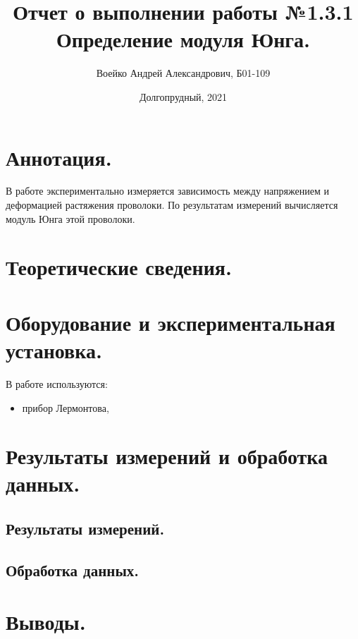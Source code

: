 \documentclass[a4paper,11pt]{article}
\title{Отчет о выполнении работы №1.3.1\\Определение модуля Юнга.}
\author{Воейко Андрей Александрович, Б01-109}
\date{Долгопрудный, 2021}
\begin{document}
\maketitle
\newpage
\section{Аннотация.}
В работе экспериментально измеряется зависимость между напряжением и деформацией  растяжения проволоки. По результатам измерений вычисляется модуль Юнга этой проволоки.
\section{Теоретические сведения.}

\section{Оборудование и экспериментальная установка.}
В работе используются:
\begin{itemize}
        \item прибор Лермонтова,
\end{itemize}
\section{Результаты измерений и обработка данных.}
\subsection{Результаты измерений.}
\subsection{Обработка данных.}
\section{Выводы.}
\end{document}
